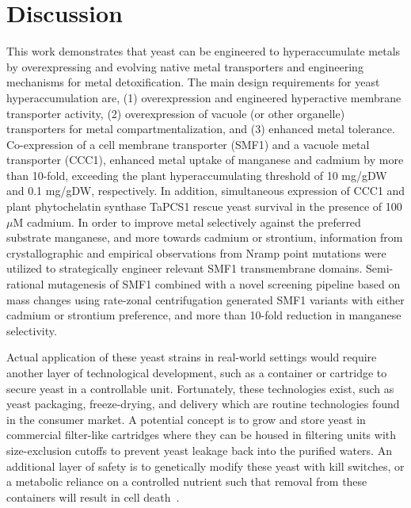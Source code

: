\documentclass[../main/main]{subfiles}
\begin{document}
\section{Discussion}
This work demonstrates that yeast can be engineered to hyperaccumulate metals by overexpressing and evolving native metal transporters and engineering mechanisms for metal detoxification. The main design requirements for yeast hyperaccumulation are, (1) overexpression and engineered hyperactive membrane transporter activity, (2) overexpression of vacuole (or other organelle) transporters for metal compartmentalization, and (3) enhanced metal tolerance. Co-expression of a cell membrane transporter (SMF1) and a vacuole metal transporter (CCC1), enhanced metal uptake of manganese and cadmium by more than 10-fold, exceeding the plant hyperaccumulating threshold of 10 mg/gDW and 0.1 mg/gDW, respectively. In addition, simultaneous expression of CCC1 and plant phytochelatin synthase TaPCS1 rescue yeast survival in the presence of 100 $\mu$M cadmium. In order to improve metal selectively against the preferred substrate manganese, and more towards cadmium or strontium, information from crystallographic and empirical observations from Nramp point mutations were utilized to strategically engineer relevant SMF1 transmembrane domains. Semi-rational mutagenesis of SMF1 combined with a novel screening pipeline based on mass changes using rate-zonal centrifugation generated SMF1 variants with either cadmium or strontium preference, and more than 10-fold reduction in manganese selectivity.

Actual application of these yeast strains in real-world settings would require another layer of technological development, such as a container or cartridge to secure yeast in a controllable unit. Fortunately, these technologies exist, such as yeast packaging, freeze-drying, and delivery which are routine technologies found in the consumer market. A potential concept is to grow and store yeast in commercial filter-like cartridges where they can be housed in filtering units with size-exclusion cutoffs to prevent yeast leakage back into the purified waters. An additional layer of safety is to genetically modify these yeast with kill switches, or a metabolic reliance on a controlled nutrient such that removal from these containers will result in cell death~\cite{chan2016}.
\end{document}
